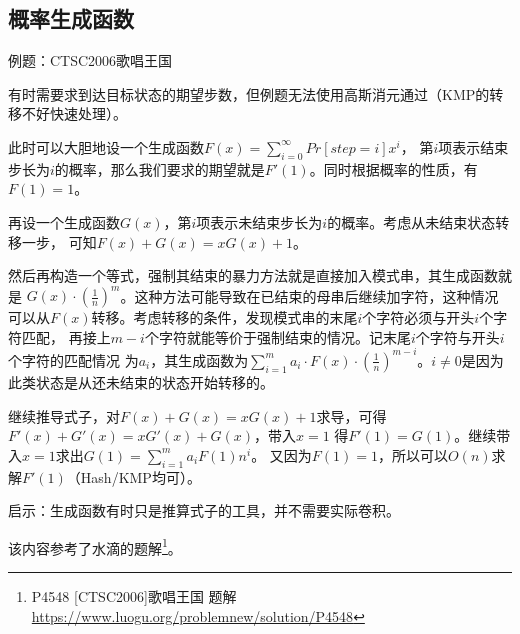 \subsection{概率生成函数}
例题：CTSC2006歌唱王国

有时需要求到达目标状态的期望步数，但例题无法使用高斯消元通过（KMP的转移不好快速处理）。

此时可以大胆地设一个生成函数$F(x)=\displaystyle \sum_{i=0}^\infty{Pr[step=i]x^i}$，
第$i$项表示结束步长为$i$的概率，那么我们要求的期望就是$F'(1)$。同时根据概率的性质，有
$F(1)=1$。

再设一个生成函数$G(x)$，第$i$项表示未结束步长为$i$的概率。考虑从未结束状态转移一步，
可知$F(x)+G(x)=xG(x)+1$。

然后再构造一个等式，强制其结束的暴力方法就是直接加入模式串，其生成函数就是
$G(x)\cdot (\frac{1}{n})^m$。这种方法可能导致在已结束的母串后继续加字符，这种情况
可以从$F(x)$转移。考虑转移的条件，发现模式串的末尾$i$个字符必须与开头$i$个字符匹配，
再接上$m-i$个字符就能等价于强制结束的情况。记末尾$i$个字符与开头$i$个字符的匹配情况
为$a_i$，其生成函数为$\displaystyle \sum_{i=1}^m{a_i\cdot F(x)\cdot
 (\frac{1}{n})^{m-i}}$。$i\neq 0$是因为此类状态是从还未结束的状态开始转移的。

继续推导式子，对$F(x)+G(x)=xG(x)+1$求导，可得$F'(x)+G'(x)=xG'(x)+G(x)$，带入$x=1$
得$F'(1)=G(1)$。继续带入$x=1$求出$G(1)=\displaystyle \sum_{i=1}^m{a_iF(1)n^i}$。
又因为$F(1)=1$，所以可以$O(n)$求解$F'(1)$（Hash/KMP均可）。

启示：生成函数有时只是推算式子的工具，并不需要实际卷积。

该内容参考了水滴的题解\footnote{
	P4548 [CTSC2006]歌唱王国 题解\\
	\url{https://www.luogu.org/problemnew/solution/P4548}
}。
